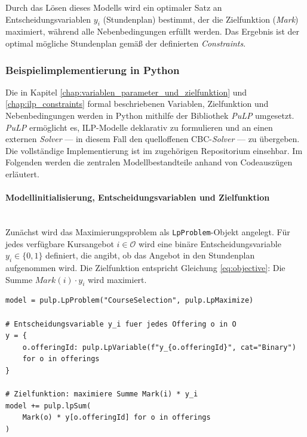 Durch das Lösen dieses Modells wird ein optimaler Satz an Entscheidungsvariablen $y_i$ (Stundenplan) bestimmt, der die Zielfunktion (\textit{Mark}) maximiert, während alle Nebenbedingungen erfüllt werden. Das Ergebnis ist der optimal mögliche Stundenplan gemäß der definierten \textit{Constraints}.


\subsubsection{Beispielimplementierung in Python}

Die in Kapitel \ref{chap:variablen_parameter_und_zielfunktion} und \ref{chap:ilp_constraints} formal beschriebenen Variablen, Zielfunktion und Nebenbedingungen werden in Python mithilfe der Bibliothek \textit{PuLP} umgesetzt. \textit{PuLP} ermöglicht es, ILP-Modelle deklarativ zu formulieren und an einen externen \textit{Solver} --- in diesem Fall den quelloffenen CBC-\textit{Solver} \cite{cbc-solver} --- zu übergeben. Die vollständige Implementierung ist im zugehörigen Repositorium \cite{gh-repo} einsehbar. Im Folgenden werden die zentralen Modellbestandteile anhand von Codeauszügen erläutert.




\paragraph{Modellinitialisierung, Entscheidungsvariablen und Zielfunktion}\hfill\\

Zunächst wird das Maximierungsproblem als \texttt{LpProblem}-Objekt angelegt. Für jedes verfügbare Kursangebot $i \in \mathcal{O}$ wird eine binäre Entscheidungsvariable $y_i \in \{0,1\}$ definiert, die angibt, ob das Angebot in den Stundenplan aufgenommen wird. Die Zielfunktion entspricht Gleichung \ref{eq:objective}: Die Summe $\textit{Mark}(i) \cdot y_i$ wird maximiert.

\begin{lstlisting}[caption={Modellinitialisierung und Zielfunktion},
                   label={lst:objective}]
model = pulp.LpProblem("CourseSelection", pulp.LpMaximize)

# Entscheidungsvariable y_i fuer jedes Offering o in O
y = {
    o.offeringId: pulp.LpVariable(f"y_{o.offeringId}", cat="Binary")
    for o in offerings
}
 
# Zielfunktion: maximiere Summe Mark(i) * y_i
model += pulp.lpSum(
    Mark(o) * y[o.offeringId] for o in offerings
)
\end{lstlisting}



